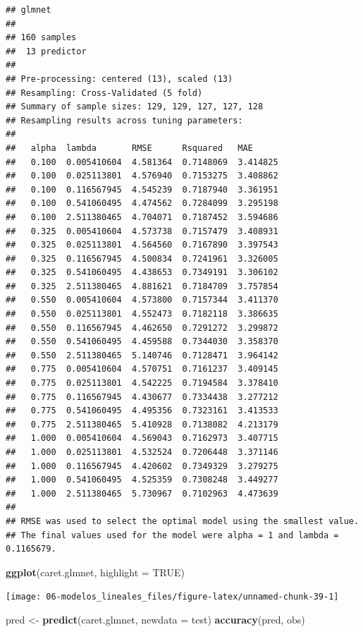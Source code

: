 \documentclass[
]{book}
\newenvironment{Shaded}{\begin{snugshade}}{\end{snugshade}}
\newcommand{\DataTypeTok}[1]{\textcolor[rgb]{0.13,0.29,0.53}{#1}}
\newcommand{\KeywordTok}[1]{\textcolor[rgb]{0.13,0.29,0.53}{\textbf{#1}}}
\newcommand{\NormalTok}[1]{#1}
\newcommand{\OtherTok}[1]{\textcolor[rgb]{0.56,0.35,0.01}{#1}}
\newcommand{\StringTok}[1]{\textcolor[rgb]{0.31,0.60,0.02}{#1}}
\theoremstyle{break}
\theoremstyle{definition}
\theoremstyle{definition}
\theoremstyle{definition}
\theoremstyle{remark}
\begin{document}
\begin{verbatim}
## glmnet 
## 
## 160 samples
##  13 predictor
## 
## Pre-processing: centered (13), scaled (13) 
## Resampling: Cross-Validated (5 fold) 
## Summary of sample sizes: 129, 129, 127, 127, 128 
## Resampling results across tuning parameters:
## 
##   alpha  lambda       RMSE      Rsquared   MAE     
##   0.100  0.005410604  4.581364  0.7148069  3.414825
##   0.100  0.025113801  4.576940  0.7153275  3.408862
##   0.100  0.116567945  4.545239  0.7187940  3.361951
##   0.100  0.541060495  4.474562  0.7284099  3.295198
##   0.100  2.511380465  4.704071  0.7187452  3.594686
##   0.325  0.005410604  4.573738  0.7157479  3.408931
##   0.325  0.025113801  4.564560  0.7167890  3.397543
##   0.325  0.116567945  4.500834  0.7241961  3.326005
##   0.325  0.541060495  4.438653  0.7349191  3.306102
##   0.325  2.511380465  4.881621  0.7184709  3.757854
##   0.550  0.005410604  4.573800  0.7157344  3.411370
##   0.550  0.025113801  4.552473  0.7182118  3.386635
##   0.550  0.116567945  4.462650  0.7291272  3.299872
##   0.550  0.541060495  4.459588  0.7344030  3.358370
##   0.550  2.511380465  5.140746  0.7128471  3.964142
##   0.775  0.005410604  4.570751  0.7161237  3.409145
##   0.775  0.025113801  4.542225  0.7194584  3.378410
##   0.775  0.116567945  4.430677  0.7334438  3.277212
##   0.775  0.541060495  4.495356  0.7323161  3.413533
##   0.775  2.511380465  5.410928  0.7138082  4.213179
##   1.000  0.005410604  4.569043  0.7162973  3.407715
##   1.000  0.025113801  4.532524  0.7206448  3.371146
##   1.000  0.116567945  4.420602  0.7349329  3.279275
##   1.000  0.541060495  4.525359  0.7308248  3.449277
##   1.000  2.511380465  5.730967  0.7102963  4.473639
## 
## RMSE was used to select the optimal model using the smallest value.
## The final values used for the model were alpha = 1 and lambda = 0.1165679.
\end{verbatim}

\begin{Shaded}
\begin{Highlighting}[]
\KeywordTok{ggplot}\NormalTok{(caret.glmnet, }\DataTypeTok{highlight =} \OtherTok{TRUE}\NormalTok{)}
\end{Highlighting}
\end{Shaded}

\begin{center}\texttt{[image: 06-modelos\_lineales\_files/figure-latex/unnamed-chunk-39-1]} \end{center}

\begin{Shaded}
\begin{Highlighting}[]
\NormalTok{pred <-}\StringTok{ }\KeywordTok{predict}\NormalTok{(caret.glmnet, }\DataTypeTok{newdata =}\NormalTok{ test)}
\KeywordTok{accuracy}\NormalTok{(pred, obs)}
\end{Highlighting}
\end{Shaded}
\end{document}
